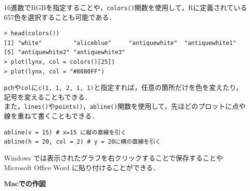 16進数でRGBを指定することや，\verb+colors()+関数を使用して，Rに定義されている657色を選択することも可能である．
\begin{breakbox}
\begin{verbatim}
> head(colors())
[1] "white"         "aliceblue"     "antiquewhite"  "antiquewhite1"
[5] "antiquewhite2" "antiquewhite3"
> plot(lynx, col = colors()[25])
> plot(lynx, col = "#8080FF")
\end{verbatim}
\end{breakbox}
{\tt pch}や{\tt col}に\verb+c(1, 1, 2, 1, 1)+と指定すれば，任意の箇所だけを色を変えたり，記号を変えることもできる．\\
また，{\tt lines()}や{\tt points()}，{\tt abline()}関数を使用して，先ほどのプロットに点や線を重ねて書くこともできる．
\begin{screen}
\begin{verbatim}
abline(v = 15) # x=15 に縦の直線を引く
abline(h = 20, col = 2) # y = 20に横の直線を引く
\end{verbatim}
\end{screen}

Windows では表示されたグラフを右クリックすることで保存することや Microsoft Office Word に貼り付けることができる．




\noindent
{\bf \large{Macでの作図}}

